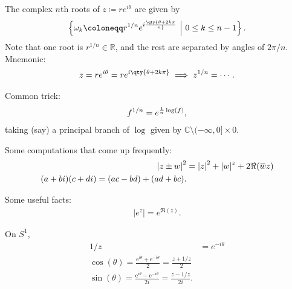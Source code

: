 \begin{fact}

The complex \(n\)th roots of \(z \coloneqq r e^{i\theta}\) are given by
\begin{align*}
\left\{{ \omega_k \coloneqq r^{1/n} e^{i \qty{ \theta + 2k\pi \over n} } {~\mathrel{\Big|}~}0 \leq k \leq n-1 }\right\}
.\end{align*}
Note that one root is \(r^{1/n}\in {\mathbb{R}}\), and the rest are
separated by angles of \(2\pi/n\). Mnemonic:
\begin{align*}
z = re^{i\theta} = re^{i\qty{\theta + 2k\pi}} \implies z^{1/n} = \cdots
.\end{align*}

\end{fact}

\begin{fact}

Common trick:
\begin{align*}
f^{1/n} = e^{{1\over n} \log(f)}
,\end{align*}
taking (say) a principal branch of \(\log\) given by
\({\mathbb{C}}\setminus(-\infty, 0] \times 0\).

\end{fact}

\begin{fact}

Some computations that come up frequently:
\begin{align*}
{\left\lvert {z \pm w} \right\rvert}^2 &= {\left\lvert {z} \right\rvert}^2 + {\left\lvert {w} \right\rvert}^z + 2\Re(\mkern 1.5mu\overline{\mkern-1.5muw\mkern-1.5mu}\mkern 1.5muz) \\
(a+bi)(c+di) = (ac - bd) + (ad + bc)
.\end{align*}

\end{fact}

\begin{fact}

Some useful facts:
\begin{align*}
{\left\lvert {e^{z}} \right\rvert} = e^{\Re(z)}
.\end{align*}

On \(S^1\),
\begin{align*}
1/z &= e^{-i\theta} \\
\cos (\theta)=\frac{\mathrm{e}^{i \theta}+\mathrm{e}^{-i \theta}}{2}=\frac{z+1 / z}{2} \\
\sin (\theta)=\frac{\mathrm{e}^{i \theta}-\mathrm{e}^{-i \theta}}{2 i}=\frac{z-1 / z}{2 i} 
.\end{align*}

\end{fact}

